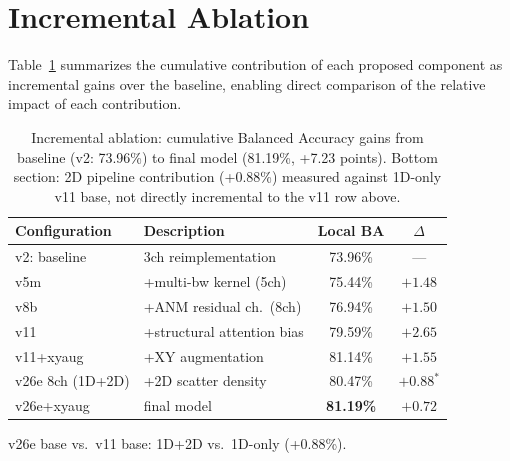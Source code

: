 \section{Incremental Ablation}
\label{sec:full_ablation}

Table~\ref{tab:ablation_full} summarizes the cumulative contribution of each proposed component as incremental gains over the baseline, enabling direct comparison of the relative impact of each contribution.

\begin{table}[ht]
	\centering
	\caption{Incremental ablation: cumulative Balanced Accuracy gains from baseline (v2: 73.96\%) to final model (81.19\%, +7.23 points). Bottom section: 2D pipeline contribution (+0.88\%) measured against 1D-only v11 base, not directly incremental to the v11 row above.}
	\label{tab:ablation_full}
	\begin{tabularx}{\textwidth}{lXcc}
		\toprule
		\textbf{Configuration}      & \textbf{Description}            & \textbf{Local BA} & \textbf{$\Delta$} \\
		\midrule
		v2: baseline                & 3ch reimplementation             & 73.96\%          & ---                \\
		v5m                        & +multi-bw kernel (5ch)           & 75.44\%          & $+1.48$            \\
		v8b                        & +ANM residual ch.\ (8ch)         & 76.94\%          & $+1.50$            \\
		v11                        & +structural attention bias       & 79.59\%          & $+2.65$            \\
		v11+xyaug                  & +XY augmentation                 & 81.14\%          & $+1.55$            \\
		\midrule
		v26e 8ch (1D+2D)           & +2D scatter density             & 80.47\%          & $+0.88^*$          \\
		v26e+xyaug                 & final model                      & \textbf{81.19\%} & $+0.72$            \\
		\bottomrule
	\end{tabularx}
	\medskip
	\noindent *v26e base vs.\ v11 base: 1D+2D vs.\ 1D-only (+0.88\%).
\end{table}

